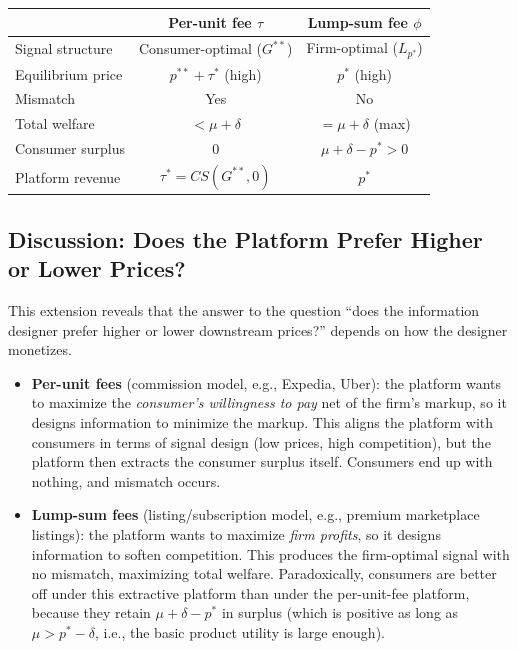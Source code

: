 \documentclass[12pt, a4paper]{article}
\begin{document}
\begin{center}
\renewcommand{\arraystretch}{1.3}
\begin{tabular}{l c c}
\toprule
 & \textbf{Per-unit fee $\tau$} & \textbf{Lump-sum fee $\phi$} \\
\midrule
Signal structure & Consumer-optimal ($G^{**}$) & Firm-optimal ($L_{p^*}$) \\
Equilibrium price & $p^{**} + \tau^*$ (high) & $p^*$ (high) \\
Mismatch & Yes & No \\
Total welfare & $< \mu + \delta$ & $= \mu + \delta$ (max) \\
Consumer surplus & $0$ & $\mu + \delta - p^* > 0$ \\
Platform revenue & $\tau^* = CS(G^{**},0)$ & $p^*$ \\
\bottomrule
\end{tabular}
\end{center}

\subsection{Discussion: Does the Platform Prefer Higher or Lower Prices?}

This extension reveals that the answer to the question ``does the information designer prefer higher or lower downstream prices?'' depends on how the designer monetizes.

\begin{itemize}
    \item \textbf{Per-unit fees} (commission model, e.g., Expedia, Uber): the platform wants to maximize the \emph{consumer's willingness to pay} net of the firm's markup, so it designs information to minimize the markup. This aligns the platform with consumers in terms of signal design (low prices, high competition), but the platform then extracts the consumer surplus itself. Consumers end up with nothing, and mismatch occurs.

    \item \textbf{Lump-sum fees} (listing/subscription model, e.g., premium marketplace listings): the platform wants to maximize \emph{firm profits}, so it designs information to soften competition. This produces the firm-optimal signal with no mismatch, maximizing total welfare. Paradoxically, consumers are better off under this extractive platform than under the per-unit-fee platform, because they retain $\mu + \delta - p^*$ in surplus (which is positive as long as $\mu > p^* - \delta$, i.e., the basic product utility is large enough).
\end{itemize}
\end{document}
